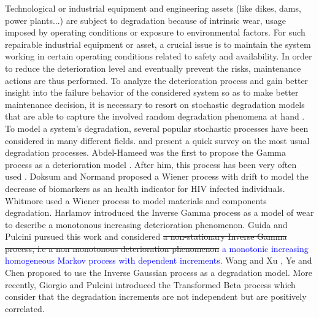 Technological or industrial equipment and engineering assets (like dikes, dams, power plants...) are subject to degradation because of intrinsic wear, usage imposed by operating conditions or exposure to environmental factors. For such repairable industrial equipment or asset, a crucial issue is to maintain the system working in certain operating conditions related to safety and availability. In order to reduce the deterioration level and eventually prevent the risks, maintenance actions are thus performed. 
To analyze the deterioration process and gain better insight into the failure behavior of the considered system so as to make better maintenance decision, it is necessary to resort on stochastic degradation models that are able to capture the involved random degradation phenomena at hand \cite{jonge_review_2020}.
To model a system's degradation, several popular stochastic processes have been considered in many different fields. 
\cite{ye_stochastic_2015} and \cite{kahle_degradation_2016} present a quick survey on the most usual degradation processes.
Abdel-Hameed was the first to propose the Gamma process as a deterioration model \cite{abdel-hameed_gamma_1975}. After him, this process has been very often used \cite{grall_continuous-time_2002,lawless_covariates_2004, van_noortwijk_survey_2009}.
Doksum and Normand \cite{doksum_gaussian_1995} proposed a Wiener process with drift to model the decrease of biomarkers as an health indicator for HIV infected individuals. Whitmore \cite{whitmore_estimating_1995} used a Wiener process to model materials and components degradation. 
Harlamov \cite{harlamov_statistics_2006} introduced the Inverse Gamma process as a model of wear to describe a monotonous increasing deterioration phenomenon. Guida and Pulcini \cite{guida_inverse_2013} pursued this work and considered \st{a non-stationary Inverse Gamma process, i.e a non monotonous deterioration phenomenon} \textcolor{blue}{a monotonic increasing homogeneous Markov process with dependent increments}. 
Wang and Xu \cite{wang_inverse_2010}, Ye and Chen \cite{ye_inverse_2014} proposed to use the Inverse Gaussian process as a degradation model.
More recently, Giorgio and Pulcini \cite{giorgio_new_2018} introduced the Transformed Beta process  which consider that the degradation increments are not independent but are positively correlated. 

